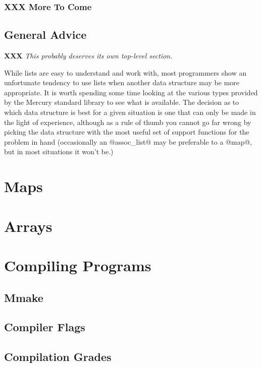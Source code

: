 \documentclass[a4paper,11pt,notitlepage,onecolumn]{article}
\newcommand{\XXX}[1]%
{{\small\textbf{XXX} \emph{#1}}}
\begin{document}
\subsubsection{XXX More To Come}

\subsection{General Advice}

\XXX{This probably deserves its own top-level section.}

While lists are easy to understand and work with, most programmers show
an unfortunate tendency to use lists when another data structure may be
more appropriate.  It is worth spending some time looking at the various
types provided by the Mercury standard library to see what is available.
The decision as to which data structure is best for a given situation is
one that can only be made in the light of experience, although as a rule
of thumb you cannot go far wrong by picking the data structure with the
most useful set of support functions for the problem in hand
(occasionally an @assoc_list@ may be preferable to a @map@, but in most
situations it won't be.)

\section{Maps}



\section{Arrays}



\section{Compiling Programs}
\subsection{Mmake}
\subsection{Compiler Flags}
\subsection{Compilation Grades}
\end{document}
